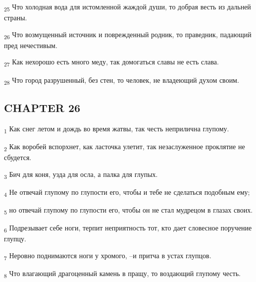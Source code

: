 \begin{tcolorbox}
\textsubscript{25} Что холодная вода для истомленной жаждой души, то добрая весть из дальней страны.
\end{tcolorbox}
\begin{tcolorbox}
\textsubscript{26} Что возмущенный источник и поврежденный родник, то праведник, падающий пред нечестивым.
\end{tcolorbox}
\begin{tcolorbox}
\textsubscript{27} Как нехорошо есть много меду, так домогаться славы не есть слава.
\end{tcolorbox}
\begin{tcolorbox}
\textsubscript{28} Что город разрушенный, без стен, то человек, не владеющий духом своим.
\end{tcolorbox}
\subsection{CHAPTER 26}
\begin{tcolorbox}
\textsubscript{1} Как снег летом и дождь во время жатвы, так честь неприлична глупому.
\end{tcolorbox}
\begin{tcolorbox}
\textsubscript{2} Как воробей вспорхнет, как ласточка улетит, так незаслуженное проклятие не сбудется.
\end{tcolorbox}
\begin{tcolorbox}
\textsubscript{3} Бич для коня, узда для осла, а палка для глупых.
\end{tcolorbox}
\begin{tcolorbox}
\textsubscript{4} Не отвечай глупому по глупости его, чтобы и тебе не сделаться подобным ему;
\end{tcolorbox}
\begin{tcolorbox}
\textsubscript{5} но отвечай глупому по глупости его, чтобы он не стал мудрецом в глазах своих.
\end{tcolorbox}
\begin{tcolorbox}
\textsubscript{6} Подрезывает себе ноги, терпит неприятность тот, кто дает словесное поручение глупцу.
\end{tcolorbox}
\begin{tcolorbox}
\textsubscript{7} Неровно поднимаются ноги у хромого, --и притча в устах глупцов.
\end{tcolorbox}
\begin{tcolorbox}
\textsubscript{8} Что влагающий драгоценный камень в пращу, то воздающий глупому честь.
\end{tcolorbox}
